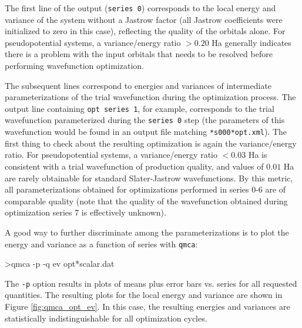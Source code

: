 The first line of 
the output (\texttt{series 0}) corresponds to the local energy 
and variance of the system without a Jastrow factor (all Jastrow 
coefficients were initialized to zero in this case), reflecting the 
quality of the orbitals alone. For pseudopotential systems, a 
variance/energy ratio $>0.20$ Ha generally indicates there is a problem 
with the input orbitals that needs to be resolved before 
performing wavefunction optimization.  

The subsequent lines correspond to energies and variances of 
intermediate parameterizations of the trial wavefunction during 
the optimization process.  The output line containing 
\texttt{opt  series 1}, for example, corresponds to the trial 
wavefunction parameterized during the \texttt{series 0} step 
(the parameters of this wavefunction would be found in an output 
file matching \texttt{*s000*opt.xml}).  The first thing to check 
about the resulting optimization is again the variance/energy ratio. 
For pseudopotential systems, a variance/energy ratio $<0.03$ Ha is 
consistent with a trial wavefunction of production quality, and values 
of $0.01$ Ha are rarely obtainable for standard Slater-Jastrow 
wavefunctions.  By this metric, all parameterizations obtained for 
optimizations performed in series 0-6 are of comparable quality 
(note that the quality of the wavefunction obtained during optimization 
series 7 is effectively unknown).

A good way to further discriminate among the parameterizations is to 
plot the energy and variance as a function of series with \texttt{qmca}:
\begin{shade}
>qmca -p -q ev opt*scalar.dat
\end{shade}
\noindent
The \texttt{-p} option results in plots of means plus error bars 
vs. series for all requested quantities.
The resulting plots for the local energy and variance are shown 
in Figure \ref{fig:qmca_opt_ev}.  In this case, the resulting energies 
and variances are statistically indistinguishable for all optimization 
cycles.  

